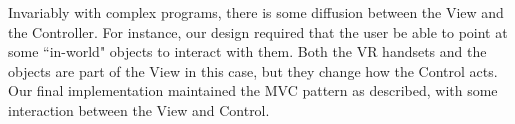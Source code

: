 Invariably with complex programs, there is some diffusion between the View and the Controller. For instance, our design required that the user be able to point at some ``in-world" objects to interact with them. Both the VR handsets and the objects are part of the View in this case, but they change how the Control acts. Our final implementation maintained the MVC pattern as described, with some interaction between the View and Control.


